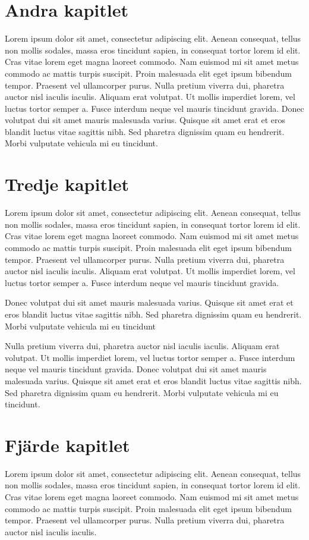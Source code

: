 \documentclass[11pt,a4paper]{article}
\begin{document}
\newpage
\section{Andra kapitlet}
Lorem ipsum dolor sit amet, consectetur adipiscing elit. Aenean
consequat, tellus non mollis sodales, massa eros tincidunt sapien, in
consequat tortor lorem id elit. Cras vitae lorem eget magna laoreet
commodo. Nam euismod mi sit amet metus commodo ac mattis turpis
suscipit. Proin malesuada elit eget ipsum bibendum tempor. Praesent
vel ullamcorper purus. Nulla pretium viverra dui, pharetra auctor nisl
iaculis iaculis. Aliquam erat volutpat. Ut mollis imperdiet lorem, vel
luctus tortor semper a. Fusce interdum neque vel mauris tincidunt
gravida. Donec volutpat dui sit amet mauris malesuada varius. Quisque
sit amet erat et eros blandit luctus vitae sagittis nibh. Sed pharetra
dignissim quam eu hendrerit. Morbi vulputate vehicula mi eu tincidunt.

\newpage
\section{Tredje kapitlet}
Lorem ipsum dolor sit amet, consectetur adipiscing elit. Aenean
consequat, tellus non mollis sodales, massa eros tincidunt sapien, in
consequat tortor lorem id elit. Cras vitae lorem eget magna laoreet
commodo. Nam euismod mi sit amet metus commodo ac mattis turpis
suscipit. Proin malesuada elit eget ipsum bibendum tempor. Praesent
vel ullamcorper purus. Nulla pretium viverra dui, pharetra auctor nisl
iaculis iaculis. Aliquam erat volutpat. Ut mollis imperdiet lorem, vel
luctus tortor semper a. Fusce interdum neque vel mauris tincidunt
gravida.

Donec volutpat dui sit amet mauris malesuada varius. Quisque sit amet
erat et eros blandit luctus vitae sagittis nibh. Sed pharetra
dignissim quam eu hendrerit. Morbi vulputate vehicula mi eu tincidunt

Nulla pretium viverra dui, pharetra auctor nisl iaculis
iaculis. Aliquam erat volutpat. Ut mollis imperdiet lorem, vel luctus
tortor semper a. Fusce interdum neque vel mauris tincidunt
gravida. Donec volutpat dui sit amet mauris malesuada varius. Quisque
sit amet erat et eros blandit luctus vitae sagittis nibh. Sed pharetra
dignissim quam eu hendrerit. Morbi vulputate vehicula mi eu tincidunt.

\newpage
\section{Fjärde kapitlet}
Lorem ipsum dolor sit amet, consectetur adipiscing elit. Aenean
consequat, tellus non mollis sodales, massa eros tincidunt sapien, in
consequat tortor lorem id elit. Cras vitae lorem eget magna laoreet
commodo. Nam euismod mi sit amet metus commodo ac mattis turpis
suscipit. Proin malesuada elit eget ipsum bibendum tempor. Praesent
vel ullamcorper purus. Nulla pretium viverra dui, pharetra auctor nisl
iaculis iaculis.
\end{document}
